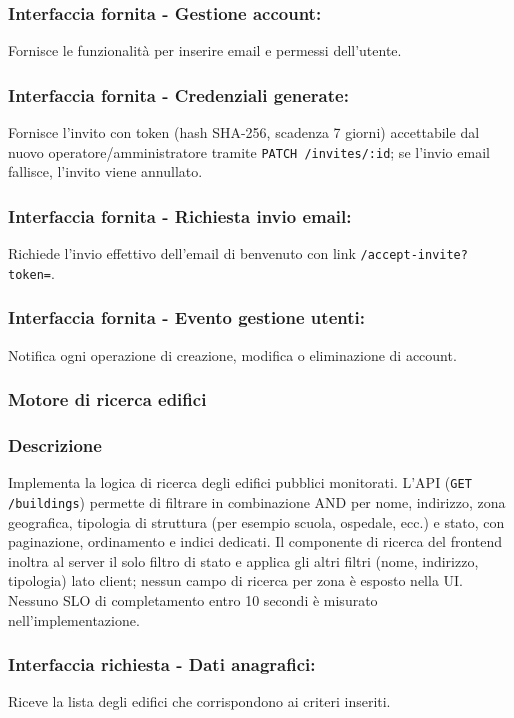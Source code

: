         \subsubsection*{Interfaccia fornita - Gestione account:}
            Fornisce le funzionalità per inserire email e permessi dell'utente.
        \subsubsection*{Interfaccia fornita - Credenziali generate:}
            Fornisce l'invito con token (hash SHA-256, scadenza 7 giorni) accettabile dal nuovo operatore/amministratore tramite \texttt{PATCH /invites/:id}; se l'invio email fallisce, l'invito viene annullato.
        \subsubsection*{Interfaccia fornita - Richiesta invio email:}
            Richiede l'invio effettivo dell'email di benvenuto con link \texttt{/accept-invite?token=}.
        \subsubsection*{Interfaccia fornita - Evento gestione utenti:}
            Notifica ogni operazione di creazione, modifica o eliminazione di account.

    \subsubsection{Motore di ricerca edifici}
        \subsubsection*{Descrizione}
            Implementa la logica di ricerca degli edifici pubblici monitorati. L'API (\texttt{GET /buildings}) permette di filtrare in combinazione AND per nome, indirizzo, zona geografica, tipologia di struttura (per esempio scuola, ospedale, ecc.) e stato, con paginazione, ordinamento e indici dedicati. Il componente di ricerca del frontend inoltra al server il solo filtro di stato e applica gli altri filtri (nome, indirizzo, tipologia) lato client; nessun campo di ricerca per zona \`e esposto nella UI. Nessuno SLO di completamento entro 10 secondi \`e misurato nell'implementazione.
        \subsubsection*{Interfaccia richiesta - Dati anagrafici:}
            Riceve la lista degli edifici che corrispondono ai criteri inseriti.
